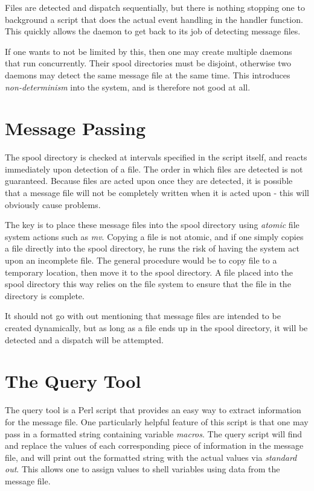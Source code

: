 \documentclass[11pt,twocolumn]{article}
\begin{document}
Files are detected and dispatch sequentially, but there is nothing stopping one to background a script that does the actual event handling in the handler function.  This quickly allows the daemon to get back to its job of detecting message files.

If one wants to not be limited by this, then one may create multiple daemons that run concurrently.  Their spool directories must be disjoint, otherwise two daemons may detect the same message file at the same time.  This introduces \textit{non-determinism} into the system, and is therefore not good at all.

\section{Message Passing}
\label{sec-spool}

The spool directory is checked at intervals specified in the script itself, and reacts immediately upon detection of a file.  The order in which files are detected is not guaranteed. Because files are acted upon once they are detected, it is possible that a message file will not be completely written when it is acted upon - this will obviously cause problems.

The key is to place these message files into the spool directory using \textit{atomic} file system actions such as \textit{mv}.  Copying a file is not atomic, and if one simply copies a file directly into the spool directory, he runs the risk of having the system act upon an incomplete file.  The general procedure would be to copy file to a temporary location, then move it to the spool directory.  A file placed into the spool directory this way relies on the file system to ensure that the file in the directory is complete.

It should not go with out mentioning that message files are intended to be created dynamically, but as long as a file ends up in the spool directory, it will be detected and a dispatch will be attempted. 

\section{The Query Tool}
\label{sec-daemon}

The query tool is a Perl script that provides an easy way to extract information for the message file.  One particularly helpful feature of this script is that one may pass in a formatted string containing variable \textit{macros}.  The query script will find and replace the values of each corresponding piece of information in the message file, and will print out the formatted string with the actual values via \textit{standard out}.  This allows one to assign values to shell variables using data from the message file.
\end{document}
